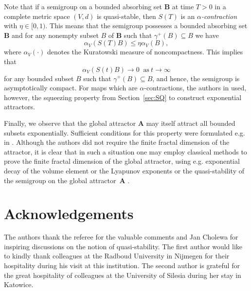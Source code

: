 \documentclass[a4paper,12pt,reqno]{amsart}
\theoremstyle{plain}
\theoremstyle{definition}
\numberwithin{equation}{section}
\renewcommand{\leq}{\leqslant}
\begin{document}
Note that if a semigroup on a bounded absorbing set $\mathbf{B}$ at time $T>0$ in a complete metric space $(V,d)$  is quasi-stable, then $S(T)$ is an \emph{$\alpha$-contraction} with $\eta\in[0,1)$. This means that the semigroup possesses a  bounded absorbing set $\mathbf{B}$ and for any nonempty subset $B$ of $\mathbf{B}$ such that $\gamma^{+}(B)\subseteq B$ we have
$$\alpha_{V}(S(T)B)\leq\eta\alpha_{V}(B),$$
where $\alpha_{V}(\cdot)$ denotes the Kuratowski measure of noncompactness. 
This implies that
$$\alpha_{V}(S(t)B)\to 0\ \text{ as}\ t\to\infty$$
for any bounded subset $B$ such that $\gamma^{+}(B)\subseteq B$, and hence,  the semigroup is asymptotically compact.  
For maps which are $\alpha$-contractions, the authors in \cite{EFK98} used, however, the squeezing property from Section~\ref{sec:SQ} to construct exponential attractors.

Finally, we observe that the global attractor $\mathbf{A}$ may itself attract all bounded subsets exponentially. Sufficient conditions for this property were formulated e.g. in \cite{CCH11}. Although the authors did not require the finite fractal dimension of the attractor, it is clear that in such a situation one may employ classical methods to prove the finite fractal dimension of the global attractor, using e.g. exponential decay of the volume element or the Lyapunov exponents \cite[Theorems V.3.2, V.3.3]{temam} or the quasi-stability of the semigroup on the global attractor~$\mathbf{A}$ \cite[Theorem 3.4.5]{chueshov}.

\section*{Acknowledgements}
The authors thank the referee for the valuable comments and 
Jan Cholewa for inspiring discussions on the notion of quasi-stability. The first author would like to kindly thank colleagues at the Radboud University in Nijmegen for their hospitality during his visit at this institution. The second author is grateful for the great hospitality of colleagues at the University of Silesia during her stay in Katowice. 
\end{document}
